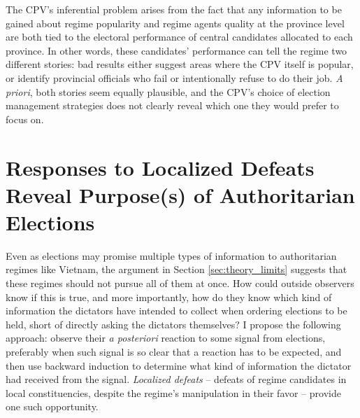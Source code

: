 \documentclass[12pt]{article}
\newcommand{\1}{\mathbbm{1}}
\begin{document}
The CPV's inferential problem arises from the fact that any information to be gained about regime popularity and regime agents quality at the province level are both tied to the electoral performance of central candidates allocated to each province. In other words, these candidates' performance can tell the regime two different stories: bad results either suggest areas where the CPV itself is popular, or identify provincial officials who fail or intentionally refuse to do their job. \textit{A priori}, both stories seem equally plausible, and the CPV's choice of election management strategies does not clearly reveal which one they would prefer to focus on.

\section{Responses to Localized Defeats Reveal Purpose(s) of Authoritarian Elections}
\label{sec:theory_local_defeat}

Even as elections may promise multiple types of information to authoritarian regimes like Vietnam, the argument in Section \ref{sec:theory_limits} suggests that these regimes should not pursue all of them at once. How could outside observers know if this is true, and more importantly, how do they know which kind of information the dictators have intended to collect when ordering elections to be held, short of directly asking the dictators themselves? I propose the following approach: observe their \textit{a posteriori} reaction to some signal from elections, preferably when such signal is so clear that a reaction has to be expected, and then use backward induction to determine what kind of information the dictator had received from the signal. \textit{Localized defeats} -- defeats of regime candidates in local constituencies, despite the regime's manipulation in their favor -- provide one such opportunity.

\end{document}
